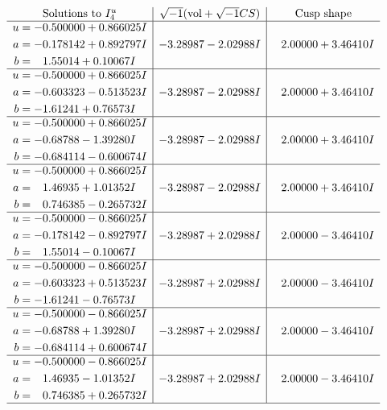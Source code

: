 \documentclass[1p]{elsarticle_modified}
\theoremstyle{definition}
\newcommand{\I}{\sqrt{-1}}
\begin{document}
$$\begin{array}{c|c|c}  
\text{Solutions to }I^u_{4}& \I (\text{vol} + \sqrt{-1}CS) & \text{Cusp shape}\\
 \hline 
\begin{aligned}
u &= -0.500000 + 0.866025 I \\
a &= -0.178142 + 0.892797 I \\
b &= \phantom{-}1.55014 + 0.10067 I\end{aligned}
 & -3.28987 - 2.02988 I & \phantom{-}2.00000 + 3.46410 I \\ \hline\begin{aligned}
u &= -0.500000 + 0.866025 I \\
a &= -0.603323 - 0.513523 I \\
b &= -1.61241 + 0.76573 I\end{aligned}
 & -3.28987 - 2.02988 I & \phantom{-}2.00000 + 3.46410 I \\ \hline\begin{aligned}
u &= -0.500000 + 0.866025 I \\
a &= -0.68788 - 1.39280 I \\
b &= -0.684114 - 0.600674 I\end{aligned}
 & -3.28987 - 2.02988 I & \phantom{-}2.00000 + 3.46410 I \\ \hline\begin{aligned}
u &= -0.500000 + 0.866025 I \\
a &= \phantom{-}1.46935 + 1.01352 I \\
b &= \phantom{-}0.746385 - 0.265732 I\end{aligned}
 & -3.28987 - 2.02988 I & \phantom{-}2.00000 + 3.46410 I \\ \hline\begin{aligned}
u &= -0.500000 - 0.866025 I \\
a &= -0.178142 - 0.892797 I \\
b &= \phantom{-}1.55014 - 0.10067 I\end{aligned}
 & -3.28987 + 2.02988 I & \phantom{-}2.00000 - 3.46410 I \\ \hline\begin{aligned}
u &= -0.500000 - 0.866025 I \\
a &= -0.603323 + 0.513523 I \\
b &= -1.61241 - 0.76573 I\end{aligned}
 & -3.28987 + 2.02988 I & \phantom{-}2.00000 - 3.46410 I \\ \hline\begin{aligned}
u &= -0.500000 - 0.866025 I \\
a &= -0.68788 + 1.39280 I \\
b &= -0.684114 + 0.600674 I\end{aligned}
 & -3.28987 + 2.02988 I & \phantom{-}2.00000 - 3.46410 I \\ \hline\begin{aligned}
u &= -0.500000 - 0.866025 I \\
a &= \phantom{-}1.46935 - 1.01352 I \\
b &= \phantom{-}0.746385 + 0.265732 I\end{aligned}
 & -3.28987 + 2.02988 I & \phantom{-}2.00000 - 3.46410 I\\
 \hline 
 \end{array}$$\newpage
\end{document}

